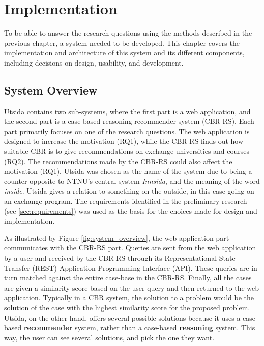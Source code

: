
\chapter{Implementation}\label{ch5:implementation}

To be able to answer the research questions using the methods described in the previous chapter, a system needed to be developed. This chapter covers the implementation and architecture of this system and its different components, including decisions on design, usability, and development.

\section{System Overview}

Utsida contains two sub-systems, where the first part is a web application, and the second part is a case-based reasoning recommender system (CBR-RS). Each part primarily focuses on one of the research questions. The web application is designed to increase the motivation (RQ1), while the CBR-RS finds out how suitable CBR is to give recommendations on exchange universities and courses (RQ2). The recommendations made by the CBR-RS could also affect the motivation (RQ1). Utsida was chosen as the name of the system due to being a counter opposite to NTNU's central system \emph{Innsida}, and the meaning of the word \emph{inside}. Utsida gives a relation to something on the outside, in this case going on an exchange program. The requirements identified in the preliminary research (sec \ref{sec:requirements})  was used as the basis for the choices made for design and implementation.

As illustrated by Figure \ref{fig:system_overview}, the web application part communicates with the CBR-RS part. Queries are sent from the web application by a user and received by the CBR-RS through its Representational State Transfer (REST) Application Programming Interface (API). These queries are in turn matched against the entire case-base in the CBR-RS. Finally, all the cases are given a similarity score based on the user query and then returned to the web application. Typically in a CBR system, the solution to a problem would be the solution of the case with the highest similarity score for the proposed problem. Utsida, on the other hand, offers several possible solutions because it uses a case-based \textbf{recommender} system, rather than a case-based \textbf{reasoning} system. This way, the user can see several solutions, and pick the one they want.  

